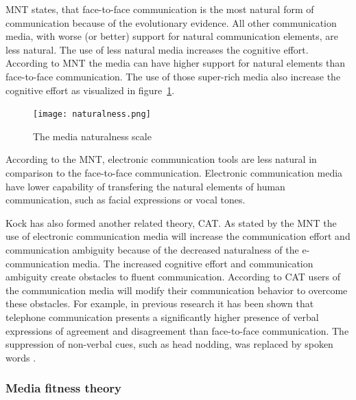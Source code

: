 \documentclass[english,12pt,a4paper,pdftex]{article}
\begin{document}

\Ac{MNT} states, that face-to-face communication is the most natural form of communication because of the evolutionary evidence. All other communication media, with worse (or better) support for natural communication elements, are less natural. The use of less natural media increases the cognitive effort. According to \ac{MNT} the media can have higher support for natural elements than face-to-face communication. The use of those super-rich media also increase the cognitive effort as visualized in figure~\ref{fig:media_naturalness_scale}. \citep{kock2005} \citep{kock2004}

\begin{figure}[htb]
\begin{center}
\texttt{[image: naturalness.png]}
\end{center}
\caption{The media naturalness scale \citep{kock2004}}
\label{fig:media_naturalness_scale}
\end{figure}

According to the \ac{MNT}, electronic communication tools are less natural in comparison to the face-to-face communication. Electronic communication media have lower capability of transfering the natural elements of human communication, such as facial expressions or vocal tones.

Kock has also formed another related theory, \ac{CAT}. As stated by the \ac{MNT} the use of electronic communication media will increase the communication effort and communication ambiguity because of the decreased naturalness of the e-communication media. The increased cognitive effort and communication ambiguity create obstacles to fluent communication. According to \ac{CAT} users of the communication media will modify their communication behavior to overcome these obstacles. For example, in previous research it has been shown that telephone communication presents a significantly higher presence of verbal expressions of agreement and disagreement than face-to-face communication. The suppression of non-verbal cues, such as head nodding, was replaced by spoken words \citep{kock2007}.

\subsubsection{Media fitness theory}
\end{document}
